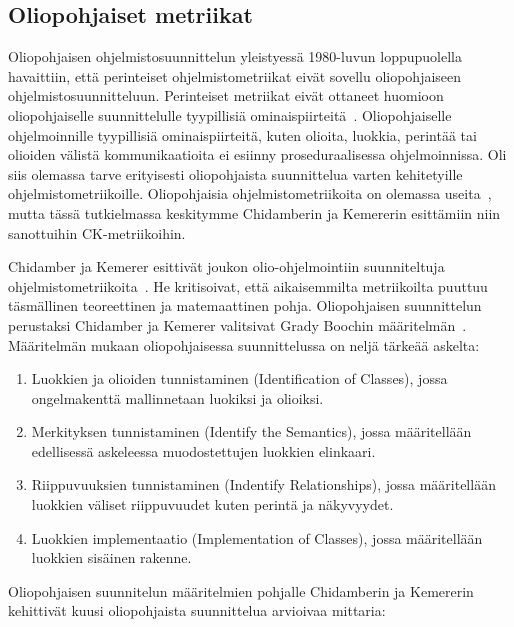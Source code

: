 \documentclass[finnish]{tktltiki2}
\theoremstyle{definition}
\theoremstyle{remark}
\begin{document}
\subsection{Oliopohjaiset metriikat}

Oliopohjaisen ohjelmistosuunnittelun yleistyessä 1980-luvun loppupuolella havaittiin, että perinteiset ohjelmistometriikat eivät sovellu oliopohjaiseen ohjelmistosuunnitteluun. Perinteiset metriikat eivät ottaneet huomioon oliopohjaiselle suunnittelulle tyypillisiä ominaispiirteitä~\cite{LH93, CK94}. Oliopohjaiselle ohjelmoinnille tyypillisiä ominaispiirteitä, kuten olioita, luokkia, perintää tai olioiden välistä kommunikaatioita ei esiinny proseduraalisessa ohjelmoinnissa. Oli siis olemassa tarve erityisesti oliopohjaista suunnittelua varten kehitetyille ohjelmistometriikoille. Oliopohjaisia ohjelmistometriikoita on olemassa useita~\cite{LH93, SC93}, mutta tässä tutkielmassa keskitymme Chidamberin ja Kemererin esittämiin niin sanottuihin CK-metriikoihin.

Chidamber ja Kemerer esittivät joukon olio-ohjelmointiin suunniteltuja ohjelmistometriikoita~\cite{CK91, CK94}. He kritisoivat, että aikaisemmilta metriikoilta puuttuu täsmällinen teoreettinen ja matemaattinen pohja. Oliopohjaisen suunnittelun perustaksi Chidamber ja Kemerer valitsivat Grady Boochin määritelmän~\cite{B94}. Määritelmän mukaan oliopohjaisessa suunnittelussa on neljä tärkeää askelta:
\begin{enumerate}
  \item Luokkien ja olioiden tunnistaminen (Identification of Classes), jossa ongelmakenttä mallinnetaan luokiksi ja olioiksi.
  \item Merkityksen tunnistaminen (Identify the Semantics), jossa määritellään edellisessä askeleessa muodostettujen luokkien elinkaari.
  \item Riippuvuuksien tunnistaminen (Indentify Relationships), jossa määritellään luokkien väliset riippuvuudet kuten perintä ja näkyvyydet.
  \item Luokkien implementaatio (Implementation of Classes), jossa määritellään luokkien sisäinen rakenne.
\end{enumerate}\newpage

Oliopohjaisen suunnitelun määritelmien pohjalle Chidamberin ja Kemererin kehittivät kuusi oliopohjaista suunnittelua arvioivaa mittaria:
\end{document}

